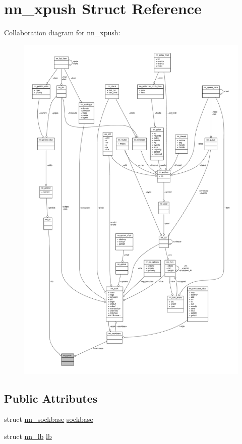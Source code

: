 \hypertarget{structnn__xpush}{}\section{nn\+\_\+xpush Struct Reference}
\label{structnn__xpush}


Collaboration diagram for nn\+\_\+xpush\+:\nopagebreak
\begin{figure}[H]
\begin{center}
\leavevmode
\includegraphics[width=350pt]{structnn__xpush__coll__graph}
\end{center}
\end{figure}
\subsection*{Public Attributes}
\begin{DoxyCompactItemize}
\item 
struct \hyperlink{structnn__sockbase}{nn\+\_\+sockbase} \hyperlink{structnn__xpush_a96831cbdff702af2735b7cb6b6ce9638}{sockbase}
\item 
struct \hyperlink{structnn__lb}{nn\+\_\+lb} \hyperlink{structnn__xpush_a1fafce229b653ae12781c4b716f17ed6}{lb}
\end{DoxyCompactItemize}


